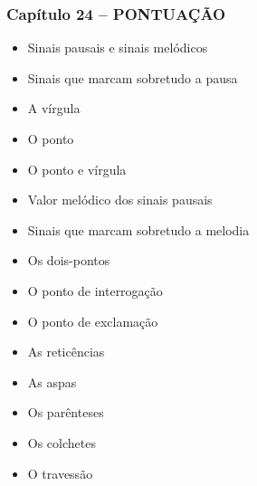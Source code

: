 \documentclass[a4paper,12pt]{article}[abntex2]
\begin{document}
\subsubsection*{Capítulo 24 – PONTUAÇÃO}
\begin{itemize}
    \item Sinais pausais e sinais melódicos
    \item Sinais que marcam sobretudo a pausa
    \item A vírgula
    \item O ponto
    \item O ponto e vírgula
    \item Valor melódico dos sinais pausais
    \item Sinais que marcam sobretudo a melodia
    \item Os dois-pontos
    \item O ponto de interrogação
    \item O ponto de exclamação
    \item As reticências
    \item As aspas
    \item Os parênteses
    \item Os colchetes
    \item O travessão
\end{itemize}
\end{document}
